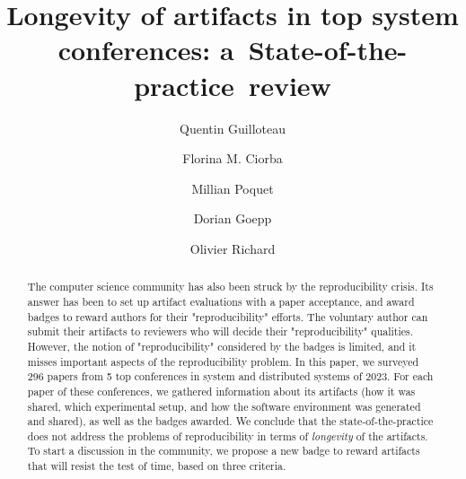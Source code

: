 \documentclass[sigconf,natbib=false]{acmart}
\begin{document}
\title{Longevity of artifacts in top system conferences: a~State-of-the-practice~review}

\author{Quentin Guilloteau}
\author{Florina M. Ciorba}

\author{Millian Poquet}

\author{Dorian Goepp}
\author{Olivier Richard}


\begin{abstract}
  The computer science community has also been struck by the reproducibility crisis.
  Its answer has been to set up artifact evaluations with a paper acceptance, and award badges to reward authors for their "reproducibility" efforts.
  The voluntary author can submit their artifacts to reviewers who will decide their "reproducibility" qualities.
  However, the notion of "reproducibility" considered by the badges is limited, and it misses important aspects of the reproducibility problem.
  In this paper, we surveyed 296 papers from 5 top conferences in system and distributed systems of 2023.
  For each paper of these conferences, we gathered information about its artifacts (how it was shared, which experimental setup, and how the software environment was generated and shared), as well as the badges awarded.
  We conclude that the state-of-the-practice does not address the problems of reproducibility in terms of \emph{longevity} of the artifacts.
  To start a discussion in the community, we propose a new badge to reward artifacts that will resist the test of time, based on three criteria.
\end{abstract}
\end{document}
